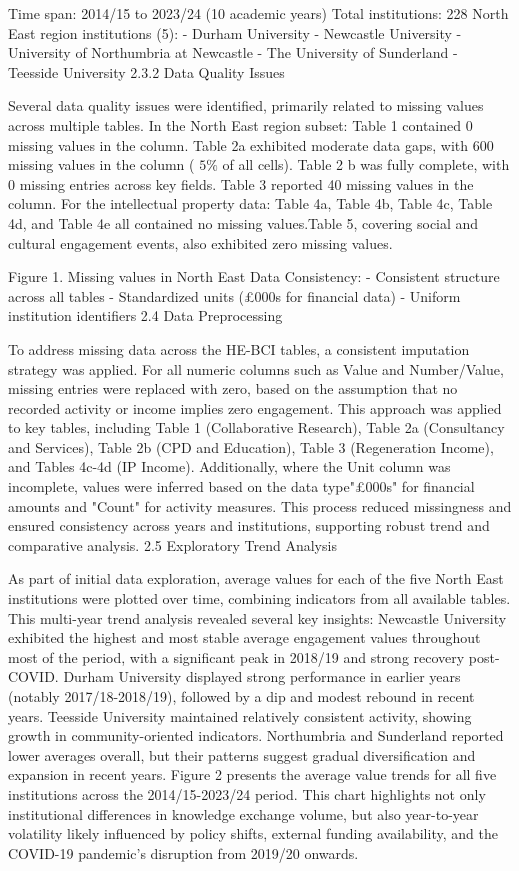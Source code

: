 Time span: 2014/15 to 2023/24 (10 academic years)
Total institutions: 228
North East region institutions (5):
- Durham University
- Newcastle University
- University of Northumbria at Newcastle
- The University of Sunderland
- Teesside University
2.3.2 Data Quality Issues

Several data quality issues were identified, primarily related to missing values across multiple tables. In the North East region subset: Table 1 contained 0 missing values in the column. Table 2a exhibited moderate data gaps, with 600 missing values in the column ( $5 \%$ of all cells). Table 2 b was fully complete, with 0 missing entries across key fields. Table 3 reported 40 missing values in the column. For the intellectual property data: Table 4a, Table 4b, Table 4c, Table 4d, and Table 4e all contained no missing values.Table 5, covering social and cultural engagement events, also exhibited zero missing values.

Figure 1. Missing values in North East
Data Consistency:
- Consistent structure across all tables
- Standardized units (£000s for financial data)
- Uniform institution identifiers
2.4 Data Preprocessing

To address missing data across the HE-BCI tables, a consistent imputation strategy was applied. For all numeric columns such as Value and Number/Value, missing entries were replaced with zero, based on the assumption that no recorded activity or income implies zero engagement. This approach was applied to key tables, including Table 1 (Collaborative Research), Table 2a (Consultancy and Services), Table 2b (CPD and Education), Table 3 (Regeneration Income), and Tables 4c-4d (IP Income). Additionally, where the Unit column was incomplete, values were inferred based on the data type"£000s" for financial amounts and "Count" for activity measures. This process reduced missingness and ensured consistency across years and institutions, supporting robust trend and comparative analysis.
2.5 Exploratory Trend Analysis

As part of initial data exploration, average values for each of the five North East institutions were plotted over time, combining indicators from all available tables. This multi-year trend analysis revealed several key insights: Newcastle University exhibited the highest and most stable average engagement values throughout most of the period, with a significant peak in 2018/19 and strong recovery post-COVID. Durham University displayed strong performance in earlier years (notably 2017/18-2018/19), followed by a dip and modest rebound in recent years. Teesside University maintained relatively consistent activity, showing growth in community-oriented indicators. Northumbria and Sunderland reported lower averages overall, but their patterns suggest gradual diversification and expansion in recent years. Figure 2 presents the average value trends for all five institutions across the 2014/15-2023/24 period. This chart highlights not only institutional differences in knowledge exchange volume, but also year-to-year volatility likely influenced by policy shifts, external funding availability, and the COVID-19 pandemic's disruption from 2019/20 onwards.


